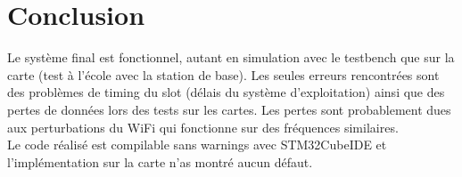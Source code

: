 \documentclass[DeseNET_Sebastien_Deriaz]{subfiles}
\begin{document}
\section{Conclusion}
Le système final est fonctionnel, autant en simulation avec le testbench que sur la carte (test à l'école avec la station de base). Les seules erreurs rencontrées sont des problèmes de timing du slot (délais du système d'exploitation) ainsi que des pertes de données lors des tests sur les cartes. Les pertes sont probablement dues aux perturbations du WiFi qui fonctionne sur des fréquences similaires.\\
Le code réalisé est compilable sans warnings avec STM32CubeIDE et l'implémentation sur la carte n'as montré aucun défaut.
\end{document}
